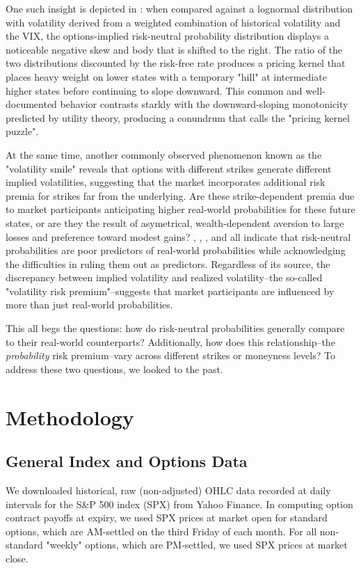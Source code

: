 \documentclass[final,3p,times,authoryear]{elsarticle}
\begin{document}
  One such insight is depicted in \citet{figlewski_risk-neutral_2018}: when compared against a lognormal distribution with volatility derived from a weighted combination of historical volatility and the VIX, the options-implied risk-neutral probability distribution displays a noticeable negative skew and body that is shifted to the right. The ratio of the two distributions discounted by the risk-free rate produces a pricing kernel that places heavy weight on lower states with a temporary "hill" at intermediate higher states before continuing to slope downward. This common and well-documented behavior contrasts starkly with the downward-sloping monotonicity predicted by utility theory, producing a conundrum that \citet{jackwerth_option-implied_2004} calls the "pricing kernel puzzle".

  At the same time, another commonly observed phenomenon known as the "volatility smile" reveals that options with different strikes generate different implied volatilities, suggesting that the market incorporates additional risk premia for strikes far from the underlying. Are these strike-dependent premia due to market participants anticipating higher real-world probabilities for these future states, or are they the result of asymetrical, wealth-dependent aversion to large losses and preference toward modest gains? \citet{jackwerth_option-implied_2004}, \citet{figlewski_risk-neutral_2018}, \citet{shiratsuka_information_2001}, and \citet{anagnou_relation_2002} all indicate that risk-neutral probabilities are poor predictors of real-world probabilities while acknowledging the difficulties in ruling them out as predictors. Regardless of its source, the discrepancy between implied volatility and realized volatility--the so-called "volatility risk premium"--suggests that market participants are influenced by more than just real-world probabilities.

  This all begs the questions: how do risk-neutral probabilities generally compare to their real-world counterparts? Additionally, how does this relationship--the \textit{probability} risk premium--vary across different strikes or moneyness levels? To address these two questions, we looked to the past.

\section{Methodology}
  \label{methodology}
  
  \subsection{General Index and Options Data}
    We downloaded historical, raw (non-adjusted) OHLC data recorded at daily intervals for the S\&P 500 index (SPX) from Yahoo Finance. In computing option contract payoffs at expiry, we used SPX prices at market open for standard options, which are AM-settled on the third Friday of each month. For all non-standard "weekly" options, which are PM-settled, we used SPX prices at market close.
\end{document}
